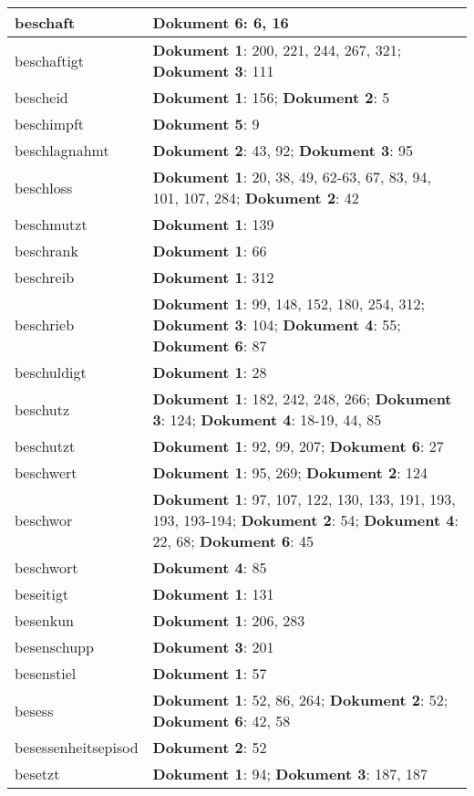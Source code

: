 \documentclass[a5paper]{article}
\begin{document}
\begin{longtable}[l]{|l|p{3in}|}
\hline
beschaft & \textbf{Dokument 6}: 6, 16 \\
\hline
beschaftigt & \textbf{Dokument 1}: 200, 221, 244, 267, 321; \textbf{Dokument 3}: 111 \\
\hline
bescheid & \textbf{Dokument 1}: 156; \textbf{Dokument 2}: 5 \\
\hline
beschimpft & \textbf{Dokument 5}: 9 \\
\hline
beschlagnahmt & \textbf{Dokument 2}: 43, 92; \textbf{Dokument 3}: 95 \\
\hline
beschloss & \textbf{Dokument 1}: 20, 38, 49, 62-63, 67, 83, 94, 101, 107, 284; \textbf{Dokument 2}: 42 \\
\hline
beschmutzt & \textbf{Dokument 1}: 139 \\
\hline
beschrank & \textbf{Dokument 1}: 66 \\
\hline
beschreib & \textbf{Dokument 1}: 312 \\
\hline
beschrieb & \textbf{Dokument 1}: 99, 148, 152, 180, 254, 312; \textbf{Dokument 3}: 104; \textbf{Dokument 4}: 55; \textbf{Dokument 6}: 87 \\
\hline
beschuldigt & \textbf{Dokument 1}: 28 \\
\hline
beschutz & \textbf{Dokument 1}: 182, 242, 248, 266; \textbf{Dokument 3}: 124; \textbf{Dokument 4}: 18-19, 44, 85 \\
\hline
beschutzt & \textbf{Dokument 1}: 92, 99, 207; \textbf{Dokument 6}: 27 \\
\hline
beschwert & \textbf{Dokument 1}: 95, 269; \textbf{Dokument 2}: 124 \\
\hline
beschwor & \textbf{Dokument 1}: 97, 107, 122, 130, 133, 191, 193, 193, 193-194; \textbf{Dokument 2}: 54; \textbf{Dokument 4}: 22, 68; \textbf{Dokument 6}: 45 \\
\hline
beschwort & \textbf{Dokument 4}: 85 \\
\hline
beseitigt & \textbf{Dokument 1}: 131 \\
\hline
besenkun & \textbf{Dokument 1}: 206, 283 \\
\hline
besenschupp & \textbf{Dokument 3}: 201 \\
\hline
besenstiel & \textbf{Dokument 1}: 57 \\
\hline
besess & \textbf{Dokument 1}: 52, 86, 264; \textbf{Dokument 2}: 52; \textbf{Dokument 6}: 42, 58 \\
\hline
besessenheitsepisod & \textbf{Dokument 2}: 52 \\
\hline
besetzt & \textbf{Dokument 1}: 94; \textbf{Dokument 3}: 187, 187 \\

\end{longtable}
\end{document}
